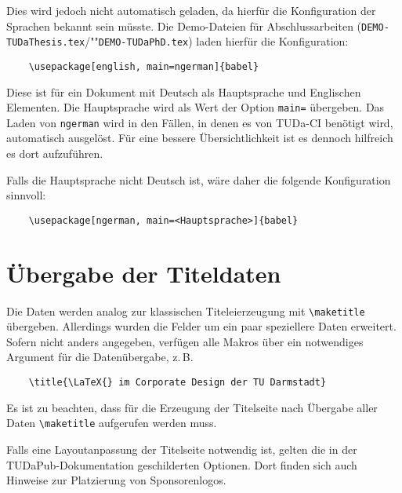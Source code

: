 \documentclass[
	german,%
	ruledheaders=chapter,%
	class=book,%
	thesis={%
			type=dr,
			dr=rernat
		},
	fontsize=11pt,%
	parskip=half-,%
	custommargins=true,%
	marginpar=false,%
	accentcolor=9c,%
]{tudapub}
\let\file\texttt
\begin{document}
Dies wird jedoch nicht automatisch geladen, da hierfür die Konfiguration der Sprachen bekannt sein müsste. Die Demo-Dateien für Abschlussarbeiten (\file{DEMO-TUDaThesis.tex}/""\file{DEMO-TUDaPhD.tex}) laden hierfür die Konfiguration:
\begin{verbatim}
    \usepackage[english, main=ngerman]{babel}
\end{verbatim}
Diese ist für ein Dokument mit Deutsch als Hauptsprache und Englischen Elementen.
Die Hauptsprache wird als Wert der Option \verb+main=+ übergeben.
Das Laden von \verb+ngerman+ wird in den Fällen, in denen es von TUDa-CI benötigt wird, automatisch ausgelöst.
Für eine bessere Übersichtlichkeit ist es dennoch hilfreich es dort aufzuführen.

Falls die Hauptsprache nicht Deutsch ist, wäre daher die folgende Konfiguration sinnvoll:
\begin{verbatim}
    \usepackage[ngerman, main=<Hauptsprache>]{babel}
\end{verbatim}

\section{Übergabe der Titeldaten}

Die Daten werden analog zur klassischen Titeleierzeugung mit \verb+\maketitle+ übergeben. Allerdings wurden die Felder um ein paar speziellere Daten erweitert. Sofern nicht anders angegeben, verfügen alle Makros über ein notwendiges Argument für die Datenübergabe, z.\,B.
\begin{verbatim}
    \title{\LaTeX{} im Corporate Design der TU Darmstadt}
\end{verbatim}
Es ist zu beachten, dass für die Erzeugung der Titelseite nach Übergabe aller Daten \verb+\maketitle+ aufgerufen werden muss.

Falls eine Layoutanpassung der Titelseite notwendig ist, gelten die in der TUDaPub-Dokumentation \cite{tudapub} geschilderten Optionen. Dort finden sich auch Hinweise zur Platzierung von Sponsorenlogos.
\end{document}
